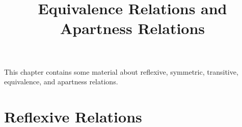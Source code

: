 

%



\title{Equivalence Relations and Apartness Relations}

\maketitle

\label{section-phantom}

This chapter contains some material about reflexive, symmetric, transitive, equivalence, and apartness relations.

\ChapterTableOfContents

\section{Reflexive Relations}\label{section-reflexive-relations}
